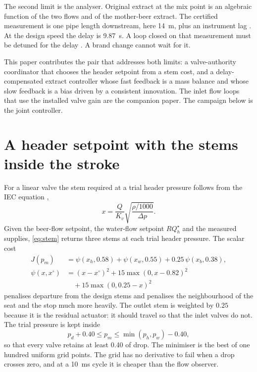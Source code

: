 \documentclass[conference,a4paper]{IEEEtran}
\begin{document}
The second limit is the analyser. Original extract at the mix point is an algebraic function of the two flows and of the mother-beer extract. The certified measurement is one pipe length downstream, here \SI{14}{m}, plus an instrument lag \cite{baker2016flow,mebak2013wort}. At the design speed the delay is \SI{9.87}{s}. A loop closed on that measurement must be detuned for the delay \cite{skogestad2003simc,normey2008survey}. A brand change cannot wait for it.

This paper contributes the pair that addresses both limits: a valve-authority coordinator that chooses the header setpoint from a stem cost, and a delay-compensated extract controller whose fast feedback is a mass balance and whose slow feedback is a bias driven by a consistent innovation. The inlet flow loops that use the installed valve gain are the companion paper. The campaign below is the joint controller.

\section{A header setpoint with the stems inside the stroke}
For a linear valve the stem required at a trial header pressure follows from the IEC equation \cite{iec60534,fisher2005valve},
\begin{equation}
\label{eq:stem}
x = \frac{Q}{K_v}\sqrt{\frac{\rho/1000}{\Delta p}}.
\end{equation}
Given the beer-flow setpoint, the water-flow setpoint $R Q_h^\star$ and the measured supplies, \eqref{eq:stem} returns three stems at each trial header pressure. The scalar cost
\begin{equation}
\label{eq:J}
\begin{aligned}
J(p_m) &= \psi(x_h,0.58)+\psi(x_w,0.55)+0.25\,\psi(x_b,0.38),\\
\psi(x,x^\circ) &= (x-x^\circ)^2+15\max(0,x-0.82)^2\\
&\quad+15\max(0,0.25-x)^2
\end{aligned}
\end{equation}
penalises departure from the design stems and penalises the neighbourhood of the seat and the stop much more heavily. The outlet stem is weighted by $0.25$ because it is the residual actuator: it should travel so that the inlet valves do not. The trial pressure is kept inside
\begin{equation}
p_d+0.40 \le p_m \le \min(p_h,p_w)-0.40,
\end{equation}
so that every valve retains at least \SI{0.40}{\barg} of drop. The minimiser is the best of one hundred uniform grid points. The grid has no derivative to fail when a drop crosses zero, and at a \SI{10}{ms} cycle it is cheaper than the flow observer.
\end{document}

